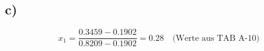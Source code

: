 

\subsection*{c)}
\[
    x_{1} = \frac{0.3459 - 0.1902}{0.8209 - 0.1902} = 0.28 \quad \text{(Werte aus TAB A-10)}
\]